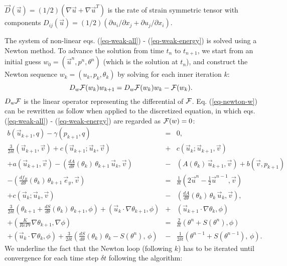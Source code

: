 $\vec D(\vec u) = (1/2)\left( \nabla \vec u + \nabla \vec u^T \right)$ is the rate of strain symmetric tensor with components
$D_{ij}(\vec u) = (1/2) \left( \partial u_i/ \partial x_j + \partial u_j/ \partial x_i \right) $.

The system of non-linear eqs. (\ref{eq-weak-all}) - (\ref{eq-weak-energy}) is solved using a Newton method. To advance the solution from time $t_n$ to $t_{n+1}$, we start from an initial guess $w_0 = (\vec{u}^{n}, p^{n}, \theta^{n})$ (which is the solution at $t_n$), and construct the Newton sequence $w_k = (u_k, p_k, \theta_k)$ by solving for each inner iteration $k$:
\begin{equation}
D_w{\cal F} (w_k ) w_{k+1} = D_w{\cal F}(w_k) w_k -  {\cal F}(w_k).
\label{eq-newton-w}
\end{equation}
$D_w{\cal F}$ is the linear operator representing the differential of $\cal F$.
Eq. (\ref{eq-newton-w}) can be rewritten as follow when applied to the discretized equation, in which eqs. (\ref{eq-weak-all}) - (\ref{eq-weak-energy}) are regarded as ${\cal F}(w) = 0$:
\begingroup \small{
	\begin{eqnarray} \label{eq-newton-C1}
	b\left(\vec{u}_{k+1}, q\right) - \gamma (p_{k+1},q) &=& 0, \\ %
	\frac{3}{2 \delta t} \left(\vec{u}_{k+1},\vec{v}\right)
	+ c\left(\vec{u}_{k+1} ; \vec{u}_{k}, \vec{v} \right)
	&+& c\left(\vec{u}_{k} ; \vec{u}_{k+1}, \vec{v} \right)\\ \nonumber
	+ 
	a\left( \vec{u}_{k+1}, \vec{v}\right)
	- \left(\frac{d A}{d\theta}(\theta_k)\, \theta_{k+1} \, \vec{u}_k, \vec{v}\right)
	&-& \left(A(\theta_k) \, \vec{u}_{k+1}, \vec{v}\right) + b\left(\vec{v}, p_{k+1}\right)  \\ \nonumber
	- {\left(\frac{df_B}{d\theta}(\theta_k)\, \theta_{k+1} \, \vec{e}_y, \vec{v}\right)} &=&  
	\frac{1}{\delta t} \left( 2 \vec{u}^n - \frac{1}{2} \vec{u}^{n-1},\vec{v}\right) \\ \nonumber
	+ c\left(\vec{u}_k ; \vec{u}_{k}, \vec{v} \right) 
	&-& \left(\frac{d A}{d\theta}(\theta_k)\, \theta_{k} \, \vec{u}_k, \vec{v}\right), \,\,\, \\  %
	\frac{3}{2\delta t} \left(\theta_{k+1} + \frac{dS}{d\theta}(\theta_k)\, \theta_{k+1}, \phi\right)
	+\left(\vec{u}_{k} \cdot \nabla \theta_{k+1} , \phi  \right)
	&+& \left( \vec{u}_{k+1} \cdot \nabla  \theta_k , \phi \right) \\ \nonumber
	+ \left( \frac{K}{Re Pr} \nabla \theta_{k+1}, \nabla \phi \right) 
	&=&
	\frac{2}{\delta t} \left(\theta^n + S(\theta^n) , \phi\right)  \\ \nonumber
	+\left(\vec{u}_{k} \cdot \nabla  \theta_k, \phi \right)
	+ \frac{3}{2 \delta t} \left(\frac{dS}{d\theta}(\theta_k)\, \theta_{k}  - S(\theta^n) ,\, \phi\right) 
	&-& \frac{1}{2 \delta t} \left(\theta^{n-1} + S(\theta^{n-1}),\, \phi\right).\,\,\,
	\end{eqnarray}
} \endgroup
We underline the fact that the Newton loop (following $k$) has to be iterated until convergence for each time step $\delta t$ following the algorithm:

